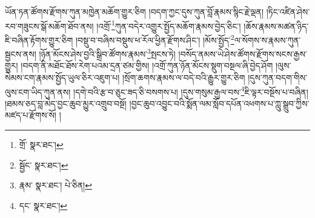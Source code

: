 ཡོན་ཏན་ཚོགས་རྫོགས་ཀུན་མཁྱེན་མཆོག་གྱུར་ཅིག །བདག་ཀྱང་དུས་ཀུན་བློ་རྣམས་སྙིང་རྗེ་ལྡན། །ཏིང་འཛིན་ཤེས་རབ་གཟུངས་སྒོ་མཆོག་ཐོབ་ནས། །འགྲོ་\footnote{གྲོ་  སྣར་ཐང་། }ཀུན་བདེར་འགྱུར་སྤྱོད་མཆོག་རྣམས་བྱེད་ཅིང་། །ཆོས་རྣམས་མཚན་ཉིད་ཇི་བཞིན་རྟོགས་གྱུར་ཅིག །བསྡུ་བ་བཞིས་བསྡུས་ཕ་རོལ་ཕྱིན་རྫོགས་ཤིང་། །མོས་སྤྱོད་\footnote{སྦྱོང་  སྣར་ཐང་། }ལ་སོགས་ས་རྣམས་ཀུན་སྦྱངས་ནས། །ཉོན་མོངས་ཤེས་བྱའི་སྒྲིབ་ཚོགས་རྣམས་\footnote{རྣམ་  སྣར་ཐང་།  པེ་ཅིན། }སྤངས་ཏེ། །བསོད་ནམས་ཡེ་ཤེས་ཚོགས་རྫོགས་སངས་རྒྱས་གྱུར། །བདག་ནི་མཐོང་ཐོས་རེག་པའམ་དྲན་ཙམ་གྱིས། །འགྲོ་ཀུན་ཉོན་མོངས་སྡུག་བསྔལ་ཞི་བྱེད་ཤོག །ལུས་སེམས་ངག་རྣམས་སྤྱོད་ཡུལ་ཅིར་འཇུག་པ། །སྲོག་ཆགས་རྣམས་ལ་བདེ་བའི་རྒྱུར་གྱུར་ཅིག །དུས་ཀུན་བདག་གིས་ལུས་ངག་ཡིད་ཀུན་ནས། །དགེ་བའི་རྩ་བ་ཅུང་ཟད་ཅི་བསགས་པ། །དུས་གསུམ་རྒྱལ་བས་\footnote{དང་  སྣར་ཐང་། }ཇི་ལྟར་བསྔོས་པ་བཞིན། །ཐམས་ཅད་བླ་མེད་བྱང་ཆུབ་མྱུར་འགྲུབ་བསྔོ། །བྱང་ཆུབ་འབྱུང་བའི་སྨོན་ལམ་སློབ་དཔོན་འཕགས་པ་ཀླུ་སྒྲུབ་ཀྱིས་མཛད་པ་རྫོགས་སོ། །